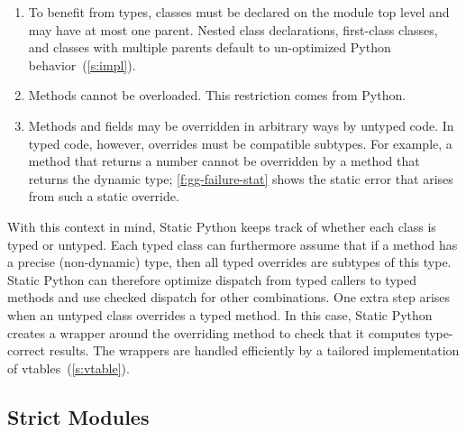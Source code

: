 \documentclass[english,cleveref,submission]{programming}
\newcommand{\SP}{Static Python}
\newcommand{\code}[1]{\texttt{#1}}
\begin{document}
\begin{enumerate}
  \item
    To benefit from types, classes must be declared on the module top level
    and may have at most one parent.
    Nested class declarations, first-class classes, and classes with
    multiple parents default to un-optimized Python behavior~(\cref{s:impl}).

  \item
    Methods cannot be overloaded.
    This restriction comes from Python.

  \item
    Methods and fields may be overridden in arbitrary ways by untyped code.
    In typed code, however, overrides must be compatible subtypes.
    For example, a method that returns a number cannot be overridden by a method
    that returns the dynamic type; \cref{f:gg-failure-stat} shows the static error
    that arises from such a static override.


\end{enumerate}
%
With this context in mind, \SP{} keeps track of whether each class is typed or untyped.
Each typed class can furthermore assume that if a method has a precise (non-dynamic)
type, then all typed overrides are subtypes of this type.
\SP{} can therefore optimize dispatch from typed callers to typed methods
and use checked dispatch for other combinations.
One extra step arises when an untyped class overrides a typed method.
In this case, \SP{} creates a wrapper around the overriding method to check
that it computes type-correct results.
The wrappers are handled efficiently by a tailored implementation of vtables~(\cref{s:vtable}).


\subsection{Strict Modules}
\label{s:strict-mod}

\end{document}

